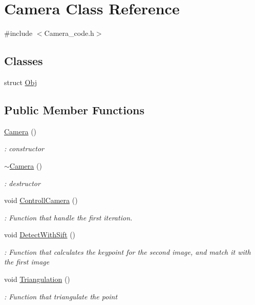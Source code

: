 \hypertarget{classCamera}{\section{Camera Class Reference}
\label{classCamera}
}


{\ttfamily \#include $<$Camera\-\_\-code.\-h$>$}

\subsection*{Classes}
\begin{DoxyCompactItemize}
\item 
struct \hyperlink{structCamera_1_1Obj}{Obj}
\end{DoxyCompactItemize}
\subsection*{Public Member Functions}
\begin{DoxyCompactItemize}
\item 
\hyperlink{classCamera_a01f94c3543f56ede7af49dc778f19331}{Camera} ()
\begin{DoxyCompactList}\small\item\em \-: constructor \end{DoxyCompactList}\item 
\hyperlink{classCamera_ad1897942d0ccf91052386388a497349f}{$\sim$\-Camera} ()
\begin{DoxyCompactList}\small\item\em \-: destructor \end{DoxyCompactList}\item 
void \hyperlink{classCamera_a554d1f24580bd3dd28ba88f59accda9b}{Controll\-Camera} ()
\begin{DoxyCompactList}\small\item\em \-: Function that handle the first iteration. \end{DoxyCompactList}\item 
void \hyperlink{classCamera_a66a1a215b01f54735cbebe155286c375}{Detect\-With\-Sift} ()
\begin{DoxyCompactList}\small\item\em \-: Function that calculates the keypoint for the second image, and match it with the first image \end{DoxyCompactList}\item 
void \hyperlink{classCamera_a34aa1d42610e1300bbaba06783a7c4bc}{Triangulation} ()
\begin{DoxyCompactList}\small\item\em \-: Function that triangulate the point \end{DoxyCompactList}\end{DoxyCompactItemize}
